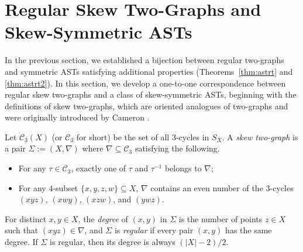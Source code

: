 \documentclass[11pt,oneside]{amsart}
\newcommand{\defn}[1]{\textit{#1}}
\begin{document}
{\section{Regular Skew Two-Graphs and Skew-Symmetric ASTs}\label{sec:skewtwograph}
In the previous section, we established a bijection between regular two-graphs and symmetric ASTs satisfying additional properties (Theorems~\ref{thm:astrt} and \ref{thm:astrt2}). In this section, we develop a one-to-one  correspondence between regular skew two-graphs and a class of skew-symmetric ASTs, beginning with the definitions of skew two-graphs, which are oriented analogues of two-graphs and were originally introduced by Cameron \cite{MR505778}. 





Let $\mathcal C_3(X)$ (or $\mathcal C_3$ for short) be the set of all $3$-cycles in $S_X$. %
A \defn{skew two-graph} is a pair  $\Sigma:=(X,\nabla)$ where  $\nabla\subseteq\mathcal C_3$ satisfying the following.
\begin{itemize}
    \item [(S1)] For any $\tau\in \mathcal C_3$, exactly one of $\tau$ and $\tau^{-1}$ belongs to $\nabla$;
    \item [(S2)] For any $4$-subset $\{x,y,z,w\} \subseteq X$,  $\nabla$ contains an even number of the $3$-cycles $(xyz)$, $(xwy)$, $(xzw)$, and $(ywz)$.    
\end{itemize} 
For distinct  $x,y\in X$, the \defn{degree} of  $(x,y)$ in $\Sigma$  is the number of points $z\in X$ such that $(xyz)\in\nabla$, and $\Sigma$ is \defn{regular} if every pair $(x,y)$ has the same degree. 
If $\Sigma$ is regular, then its degree is always $(|X|-2)/2$. 


}
\end{document}
